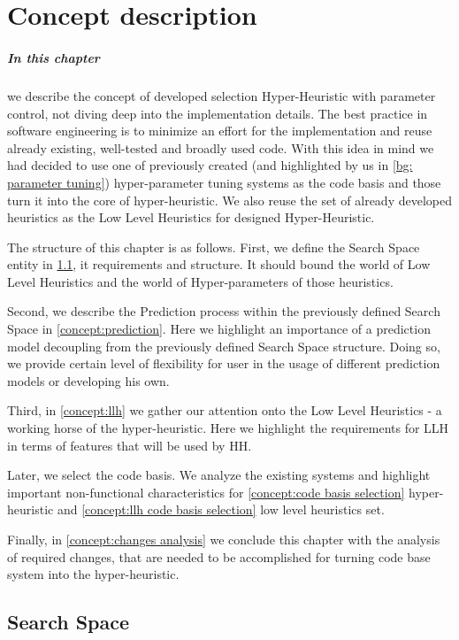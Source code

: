 \chapter{Concept description}
\paragraph{In this chapter} we describe the concept of developed selection Hyper-Heuristic with parameter control, not diving deep into the implementation details.
The best practice in software engineering is to minimize an effort for the implementation and reuse already existing, well-tested and broadly used code.
With this idea in mind we had decided to use one of previously created (and highlighted by us in \ref{bg: parameter tuning}) hyper-parameter tuning systems as the code basis and those turn it into the core of hyper-heuristic.
We also reuse the set of already developed heuristics as the Low Level Heuristics for designed Hyper-Heuristic.

The structure of this chapter is as follows.
First, we define the Search Space entity in \ref{concept:search space}, it requirements and structure. 
It should bound the world of Low Level Heuristics and the world of Hyper-parameters of those heuristics.


Second, we describe the Prediction process within the previously defined Search Space in \ref{concept:prediction}.
Here we highlight an importance of a prediction model decoupling from the previously defined Search Space structure.
Doing so, we provide certain level of flexibility for user in the usage of different prediction models or developing his own.


Third, in \ref{concept:llh} we gather our attention onto the Low Level Heuristics - a working horse of the hyper-heuristic.
Here we highlight the requirements for LLH in terms of features that will be used by HH.


Later, we select the code basis. We analyze the existing systems and highlight important non-functional characteristics for \ref{concept:code basis selection} hyper-heuristic and \ref{concept:llh code basis selection} low level heuristics set.


Finally, in \ref{concept:changes analysis} we conclude this chapter with the analysis of required changes, that are needed to be accomplished for turning code base system into the hyper-heuristic.


\section{Search Space}\label{concept:search space}
